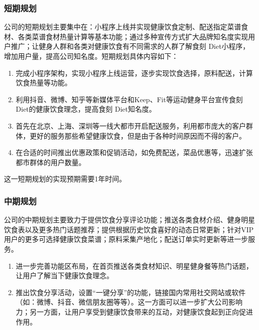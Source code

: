 \documentclass[UTF8,12pt]{ctexart}
\numberwithin{figure}{section}%
\begin{document}
\begin{spacing}{2}
\subsubsection{短期规划}
公司的短期规划主要集中在：小程序上线并实现健康饮食定制、配送指定菜谱食材、各类菜谱食材热量计算等基本功能；通过多种宣传方式扩大品牌知名度实现用户推广；让健身人群和各类对健康饮食有不同需求的人群了解食刻 Diet小程序，增加用户量，提高公司知名度。短期规划具体内容如下：
\begin{enumerate}
	\item[(1)]
	
	\setlength{\parindent}{2em}完成小程序架构，实现小程序上线运营，逐步实现饮食选择，原料配送，计算饮食热量等功能。
	
	\item[(2)] 
	
	\setlength{\parindent}{2em}利用抖音、微博、知乎等新媒体平台和Keep、Fit等运动健身平台宣传食刻 Diet的健康饮食理念，提高食刻 Diet知名度。
	
	\item[(3)] 
	
	\setlength{\parindent}{2em}首先在北京、上海、深圳等一线大都市开启配送服务，利用都市庞大的客户群体，更好的服务那些希望健康饮食，但是由于各种时间原因而不得的客户。
	
	\item[(4)]
	
	\setlength{\parindent}{2em}在合适的时间推出优惠政策和促销活动，如免费配送，菜品优惠等，迅速扩张都市群体的用户数量。
\end{enumerate}

这一短期规划的实现预期需要1年时间。

\subsubsection{中期规划}
公司的中期规划主要致力于提供饮食分享评论功能；推送各类食材介绍、健身明星饮食表以及更多热门话题推荐；提供根据历史饮食喜好的动态日常更新；针对VIP用户的更多可选择健康饮食菜谱；原料采集产地化；配送订单实时更新等进一步服务。

\begin{enumerate}
	\item[(1)]进一步完善功能区布局，在首页推送各类食材知识、明星健身餐等热门话题，让用户了解当下健康饮食理念。
	
	\item[(2)] 推出饮食分享活动，设置“一键分享”的功能，链接国内常用社交网站或软件（如：微博、抖音、微信朋友圈等等）。这一方面可以进一步扩大公司影响力；另一方面，让用户享受到健康饮食带来的互动，对健康饮食起到正向促进作用。
	

\end{enumerate}
\end{spacing}
\end{document}
